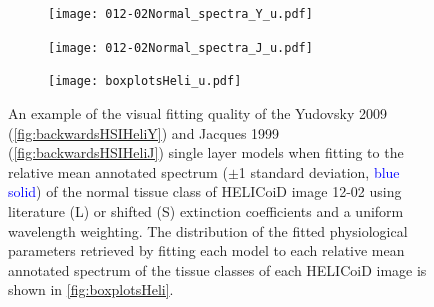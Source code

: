 \begin{subappendices}
\begin{figure}[h!]
    \centering
    \begin{subfigure}{0.49\textwidth}
        \texttt{[image: 012-02Normal\_spectra\_Y\_u.pdf]}
        \caption{}
        \label{fig:backwardsHSIHeliYuniform}
    \end{subfigure}
    \begin{subfigure}{0.49\textwidth}
        \texttt{[image: 012-02Normal\_spectra\_J\_u.pdf]}
        \caption{}
        \label{fig:backwardsHSIHeliJuniform}
    \end{subfigure}
    \begin{subfigure}{\textwidth}
        \texttt{[image: boxplotsHeli\_u.pdf]}
        \caption{}
        \label{fig:boxplotsHeliuniform}
    \end{subfigure}
    \caption{An example of the visual fitting quality of the Yudovsky 2009 (\ref{fig:backwardsHSIHeliY}) and Jacques 1999 (\ref{fig:backwardsHSIHeliJ}) single layer models when fitting to the relative mean annotated spectrum ($\pm$1 standard deviation, \textcolor{blue}{blue solid}) of the normal tissue class of HELICoiD image 12-02 using literature (L) or shifted (S) extinction coefficients and a uniform wavelength weighting. The distribution of the fitted physiological parameters retrieved by fitting each model to each relative mean annotated spectrum of the tissue classes of each HELICoiD image is shown in \ref{fig:boxplotsHeli}.}
    \label{fig:HELICoiDannuniform}
\end{figure}
\FloatBarrier
\end{subappendices}
